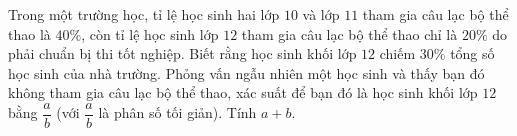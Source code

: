 \begin{ex}
Trong một trường học, tỉ lệ học sinh hai lớp $10$ và lớp $11$ tham gia câu lạc bộ thể thao là $40\%$, còn tỉ lệ học sinh lớp $12$ tham gia câu lạc bộ thể thao chỉ là $20\%$ do phải chuẩn bị thi tốt nghiệp. Biết rằng học sinh khối lớp $12$ chiếm $30\%$ tổng số học sinh của nhà trường. Phỏng vấn ngẫu nhiên một học sinh và thấy bạn đó không tham gia câu lạc bộ thể thao, xác suất để bạn đó là học sinh khối lớp $12$ bằng $\dfrac ab$ (với $\dfrac ab$ là phân số tối giản). Tính $a+b$.
\end{ex}
